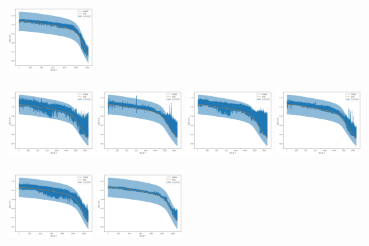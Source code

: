 \documentclass{beamer}
\begin{document}
\begin{frame}
\begin{figure}[htbp]
			{\label{fig:subfig4}\includegraphics[width=0.2\textwidth]{figures/soh_vitq/tri_group1_cell2_cnn_viq_trans.jpg}}
	\end{figure}
	\begin{figure}[htbp]
		\centering
			{\label{fig:subfig1}\includegraphics[width=0.2\textwidth]{figures/soh_vitq/tri_group1_cell3_cnn_vit.jpg}}
			{\label{fig:subfig2}\includegraphics[width=0.2\textwidth]{figures/soh_vitq/tri_group1_cell3_cnn_viq.jpg}}
			{\label{fig:subfig3}\includegraphics[width=0.2\textwidth]{figures/soh_vitq/tri_group1_cell3_cnn_vit_trans.jpg}}
			{\label{fig:subfig4}\includegraphics[width=0.2\textwidth]{figures/soh_vitq/tri_group1_cell3_cnn_viq_trans.jpg}}
	\end{figure}
	\begin{figure}[htbp]
		\centering
			{\label{fig:subfig1}\includegraphics[width=0.2\textwidth]{figures/soh_vitq/tri_group1_cell4_cnn_vit.jpg}}
			{\label{fig:subfig2}\includegraphics[width=0.2\textwidth]{figures/soh_vitq/tri_group1_cell4_cnn_viq.jpg}}

\end{figure}
\end{frame}
\end{document}
